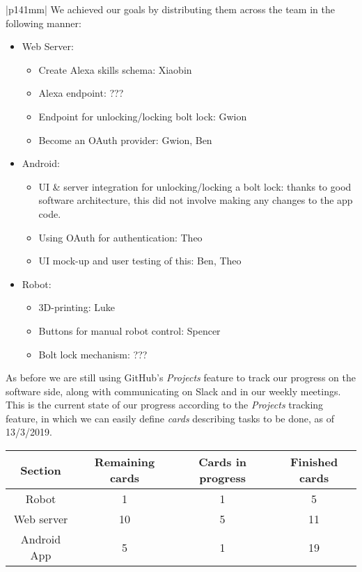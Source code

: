 \documentclass[a4paper]{article}
\newcommand{\colWidth}{141mm}
\begin{document}
\begin{center}
\begin{tabular}{|p{\colWidth}|}
		We achieved our goals by distributing them across the team in the following manner:
		\begin{itemize}
			\item Web Server:
				\begin{itemize}
					\item Create Alexa skills schema: Xiaobin
					\item Alexa endpoint: {\color{red} ???}
					\item Endpoint for unlocking/locking bolt lock: Gwion
					\item Become an OAuth provider: Gwion, Ben
				\end{itemize}
			\item Android:
				\begin{itemize}
					\item UI \& server integration for unlocking/locking a bolt lock: thanks to good software architecture, this did not involve making any changes to the app code.
					\item Using OAuth for authentication: Theo
					\item UI mock-up and user testing of this: Ben, Theo
				\end{itemize}
			\item Robot:
			\begin{itemize}
				\item 3D-printing: Luke
				\item Buttons for manual robot control: Spencer
				\item Bolt lock mechanism: {\color{red} ???}
			\end{itemize}
		\end{itemize}

		As before we are still using GitHub's \textit{Projects} feature to track our progress on the software side, along with communicating on Slack and in our weekly meetings.
		This is the current state of our progress according to the \textit{Projects} tracking feature, in which
		we can easily define \textit{cards} describing tasks to be done, as of 13/3/2019.
		
		\vspace{3mm}
		
		\begin{tabular}{| c || c | c | c |} \hline
			\textbf{Section} & \textbf{Remaining cards} & \textbf{Cards in progress} & \textbf{Finished cards}\\ \hline
			Robot & 1 & 1 & 5 \\
			Web server & 10 & 5 & 11 \\
			Android App & 5 & 1 & 19 \\ \hline
		\end{tabular}


\end{tabular}
\end{center}
\end{document}

